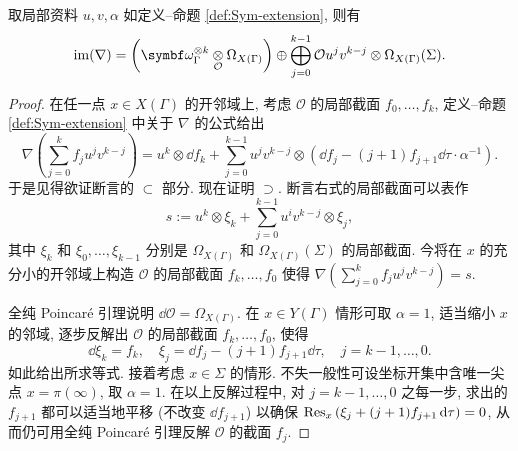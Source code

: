\begin{lemma}\label{prop:nabla-image-computation}
	取局部资料 $u, v, \alpha$ 如定义--命题 \ref{def:Sym-extension}, 则有
	\[ \Image(\nabla) = \left( \bomega_\Gamma^{\otimes k} \dotimes{\mathcal{O}} \Omega_{X(\Gamma)} \right) \oplus \bigoplus_{j=0}^{k-1} \mathcal{O} u^j v^{k-j} \otimes \Omega_{X(\Gamma)}(\Sigma). \]
\end{lemma}
\begin{proof}
	在任一点 $x \in X(\Gamma)$ 的开邻域上, 考虑 $\mathcal{O}$ 的局部截面 $f_0, \ldots, f_k$, 定义--命题 \ref{def:Sym-extension} 中关于 $\nabla$ 的公式给出
	\begin{equation}\label{eqn:Shimura-grading-computation-aux}
		\nabla\left( \sum_{j=0}^k f_j u^j v^{k-j} \right) = u^k \otimes \dd f_k + \sum_{j=0}^{k-1} u^j v^{k-j} \otimes \left( \dd f_j - (j+1) f_{j+1} \dd\tau \cdot \alpha^{-1}\right).
	\end{equation}
	于是见得欲证断言的 $\subset$ 部分. 现在证明 $\supset$. 断言右式的局部截面可以表作
	\[ s := u^k \otimes \xi_k + \sum_{j = 0}^{k-1} u^i v^{k-j} \otimes \xi_j, \]
	其中 $\xi_k$ 和 $\xi_0, \ldots, \xi_{k-1}$ 分别是 $\Omega_{X(\Gamma)}$ 和 $\Omega_{X(\Gamma)}(\Sigma)$ 的局部截面. 今将在 $x$ 的充分小的开邻域上构造 $\mathcal{O}$ 的局部截面 $f_k, \ldots, f_0$ 使得 $\nabla \left( \sum_{j=0}^k f_j u^j v^{k-j}\right) = s$.

	全纯 Poincaré 引理说明 $\dd \mathcal{O} = \Omega_{X(\Gamma)}$. 在 $x \in Y(\Gamma)$ 情形可取 $\alpha = 1$, 适当缩小 $x$ 的邻域, 逐步反解出 $\mathcal{O}$ 的局部截面 $f_k, \ldots, f_0$, 使得
	\[ \dd \xi_k = f_k, \quad \xi_j = \dd f_j - (j+1) f_{j+1} \dd\tau, \quad j = k-1, \ldots, 0. \]
	如此给出所求等式. 接着考虑 $x \in \Sigma$ 的情形. 不失一般性可设坐标开集中含唯一尖点 $x = \pi(\infty)$, 取 $\alpha = 1$. 在以上反解过程中, 对 $j = k-1, \ldots, 0$ 之每一步, 求出的 $f_{j+1}$ 都可以适当地平移 (不改变 $\dd f_{j+1}$) 以确保 $\operatorname{Res}_x \left( \xi_j + (j+1) f_{j+1} \mathop{}\!\mathrm{d}\tau \right) = 0$, 从而仍可用全纯 Poincaré 引理反解 $\mathcal{O}$ 的截面 $f_j$.
\end{proof}

